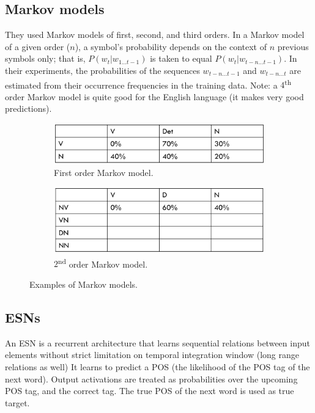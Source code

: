 \subsection{Markov models}
They used Markov models of first, second, and third orders. In a Markov model of a given order ($n$), a symbol's probability depends on the context of $n$ previous symbols only; that is, $P(w_t \vert w_{1\dots t-1})$ is taken to equal $P(w_t \vert w_{t-n\dots t-1})$. In their experiments, the probabilities of the sequences $w_{t-n\dots t-1}$ and $w_{t-n\dots t}$ are estimated from their occurrence frequencies in the training data. Note: a $4$\textsuperscript{th} order Markov model is quite good for the English language (it makes very good predictions).

\begin{figure}[!ht]
    \centering
    \captionsetup{width=.8\linewidth}
    \begin{subfigure}{.49\textwidth}
        \centering
        \includegraphics[width=.9\linewidth]{images/markov.png}
        \caption{First order Markov model.}
    \end{subfigure}
    \begin{subfigure}{.49\textwidth}
        \centering
        \includegraphics[width=.9\linewidth]{images/markov_2.png}
        \caption{$2$\textsuperscript{nd} order Markov model.}
    \end{subfigure}
    \caption{Examples of Markov models.}
    \label{fig:markov}
\end{figure}

\subsection{ESNs}
An ESN is a recurrent architecture that learns sequential relations between input elements without strict limitation on temporal integration window (long range relations as well)
It learns to predict a POS (the likelihood of the POS tag of the next word). Output activations are treated as probabilities over the upcoming POS tag, and the correct tag. The true POS of the next word is used as true target.

